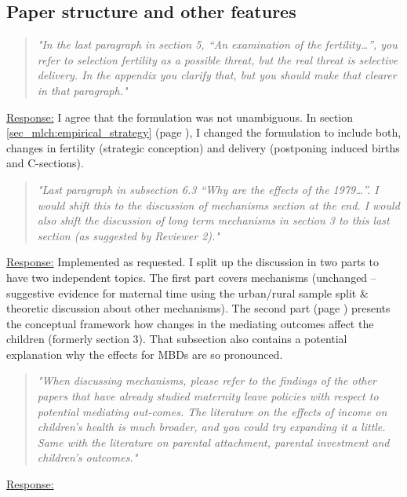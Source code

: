 \subsection*{Paper structure and other features}


\bigskip
\begin{quote}
	\textit{"In the last paragraph in section 5, “An examination of the fertility…”, you refer to selection fertility as a possible threat, but the real threat is selective delivery. In the appendix you clarify that, but you should make that clearer in that paragraph."}
\end{quote}
\underline{Response:}
I agree that the formulation was not unambiguous. In section \ref{sec_mlch:empirical_strategy} (page \pageref{rev_mlch: editor_selective_delivery}), I changed the formulation to include both, changes in fertility (strategic conception) and delivery (postponing induced births and C-sections). 




% 
\bigskip
\begin{quote}
	\textit{"Last paragraph in subsection 6.3 “Why are the effects of the 1979…”. I would shift this to the discussion of mechanisms section at the end. I would also shift the discussion of long term mechanisms in section 3 to this last section (as suggested by Reviewer 2)."}
\end{quote}
\underline{Response:} Implemented as requested. I split up the discussion in two parts to have two independent topics. The first part covers mechanisms (unchanged -- suggestive evidence for maternal time using the urban/rural sample split \& theoretic discussion about other mechanisms). The second part (page \pageref{rev_mlch: restructure_discussion_framework}) presents the conceptual framework how changes in the mediating outcomes affect the children (formerly section 3). That subsection also contains a potential explanation why the effects for MBDs are so pronounced. 



% 
\bigskip
\begin{quote}
	\textit{"When discussing mechanisms, please refer to the findings of the other papers that have already studied maternity leave policies with respect to potential mediating out-comes. The literature on the effects of income on children’s health is much broader, and you could try expanding it a little. Same with the literature on parental attachment, parental investment and children’s outcomes."}
\end{quote}
\underline{Response:}



